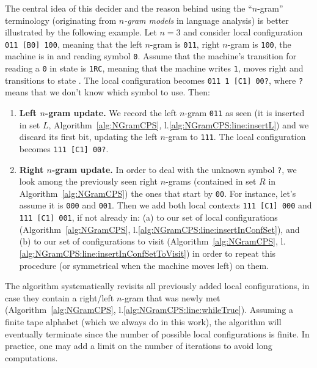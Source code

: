 The central idea of this decider and the reason behind using the ``$n$-gram'' terminology (originating from \textit{$n$-gram models} in language analysis)  is better illustrated by the following example. Let $n=3$ and consider local configuration \texttt{011 [B0] 100}, meaning that the left $n$-gram is \texttt{011}, right $n$-gram is \texttt{100}, the machine is in \stateB and reading symbol \texttt{0}. Assume that the  machine's transition for reading a \texttt{0} in state \stateB is \texttt{1RC}, meaning that the machine writes \texttt{1}, moves right and transitions to state \stateC. The local configuration becomes \texttt{011 1 [C1] 00?}, where \texttt{?} means that we don't know which symbol to use. Then:

\begin{enumerate}
    \item \textbf{Left $n$-gram update.} We record the left $n$-gram \texttt{011} as seen (it is inserted in set $L$, Algorithm~\ref{alg:NGramCPS}, l.\ref{alg:NGramCPS:line:insertL}) and we discard its first bit, updating the left $n$-gram to \texttt{111}. The local configuration becomes \texttt{111 [C1] 00?}.
    \item \textbf{Right $n$-gram update.} In order to deal with the unknown symbol \texttt{?}, we look among the previously seen right $n$-grams (contained in set $R$ in Algorithm~\ref{alg:NGramCPS}) the ones that start by \texttt{00}. For instance, let's assume it is \texttt{000} and \texttt{001}. Then we add both local contexts \texttt{111 [C1] 000} and \texttt{111 [C1] 001}, if not already in: (a) to our set of local configurations (Algorithm~\ref{alg:NGramCPS}, l.\ref{alg:NGramCPS:line:insertInConfSet}), and (b) to our set of configurations to visit (Algorithm~\ref{alg:NGramCPS}, l.\ref{alg:NGramCPS:line:insertInConfSetToVisit}) in order to repeat this procedure (or symmetrical when the machine moves left) on them.
\end{enumerate}

The algorithm systematically revisits all previously added local configurations, in case they contain a right/left $n$-gram that was newly met (Algorithm~\ref{alg:NGramCPS}, l.\ref{alg:NGramCPS:line:whileTrue}). Assuming a finite tape alphabet (which we always do in this work), the algorithm will eventually terminate since the number of possible local configurations is finite. In practice, one may add a limit on the number of iterations to avoid long computations.

